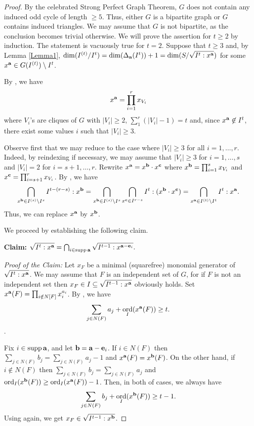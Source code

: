 \documentclass[12pt]{amsart}
\numberwithin{equation}{section}
\theoremstyle{definition}
\theoremstyle{definition}
\DeclareMathOperator{\supp}{supp}
\DeclareMathOperator{\ord}{ord}
\def\a{{\bold a}}
\def\b{{\bold b}}
\def\c{{\bold c}}
\def\e{{\bold e}}
\begin{document}
\begin{proof} By the celebrated Strong Perfect Graph Theorem, $G$ does not contain any induced odd cycle of length $\ge 5$. Thus, either $G$ is a bipartite graph or $G$ contains induced triangles. We may assume that $G$ is not bipartite, as the conclusion becomes trivial otherwise. We will prove the assertion for $t \ge 2$ by induction. The statement is vacuously true for $t=2$. Suppose that $t\ge 3$ and, by Lemma \ref{Lemma1}, $\dim(I^{(t)}/I^{t})=\dim(\Delta_\a(I^{t}))+1=\dim(S/\sqrt{I^t:x^\a})$ for some $x^\a\in G(I^{(t)})\setminus I^{t}$. 
	
By \cite[Theorem 3.10]{Su2008}, we have
	$$x^\a=\prod_{i=1}^r x_{V_i}$$
	where $V_i$'s are cliques of $G$ with $|V_i|\ge 2$, $\sum_1^r(|V_i|-1)=t$ and, since $x^\a \not\in I^t$, there exist some values $i$ such that $|V_i|\ge 3$.
	
Observe first that we may reduce to the case where $|V_i|\ge 3$ for all $i=1,\ldots,r$. Indeed, by reindexing if necessary, we may assume that $|V_i| \ge 3$ for $i = 1, \dots, s$ and $|V_i| = 2$ for $i = s+1, \dots, r$. Rewrite $x^\a=x^\b\cdot x^\c$ where $x^\b=\prod_{i=1}^s x_{V_i}$ and
	$x^\c=\prod_{i=s+1}^r x_{V_i}$. By \cite[Lemma 2.12]{MV2012}, we have
	$$\bigcap_{x^\b \in I^{(s)} \setminus I^s} I^{t-(r-s)}:x^\b=\bigcap_{x^\b \in I^{(s)}\setminus I^s} \bigcap_{x^\c\in I^{r-s}} I^t:(x^\b \cdot x^\c) = \bigcap_{x^\a \in I^{(t)} \setminus I^t} I^t: x^\a.$$
	Thus, we can replace $x^\a$ by $x^\b$.
	
We proceed by establishing the following claim.
	
\noindent \textbf{Claim:} $\sqrt{I^t:x^\a}=\bigcap_{i\in \supp\a}\sqrt{I^{t-1}:x^{\a-\e_i}}.$
	
\noindent\textit{Proof of the Claim:} Let $x_F$ be a minimal (squarefree) monomial generator of $\sqrt{I^t:x^\a}$. We may assume that $F$ is an independent set of $G$, for if $F$ is not an independent set then $x_F \in I \subseteq \sqrt{I^{t-1} : x^\a}$ obviously holds. Set $x^\a(F)=\prod_{i\notin N[F]}x_i^{a_i}$. By  \cite[Lemma 2.18]{MV2023}, we have
	$$\sum_{j\in N(F)}a_j+\ord_{I}(x^\a(F))\ge t.$$. 
	
	Fix $i\in\supp \a$, and let $\b=\a-\e_i$. 
	If $i\in N(F)$ then $\sum_{j\in N(F)}b_j=\sum_{j\in N(F)}a_j-1$ and $x^\a(F)=x^\b(F)$. 
	On the other hand, if $i\notin N(F)$ then $\sum_{j\in N(F)}b_j=\sum_{j\in N(F)}a_j$ and $\ord_I(x^\b(F))\ge \ord_I(x^\a(F))-1$. Then, in both of cases, we always have 
	$$\sum_{j\in N(F)} b_j + \ord_{I} (x^\b(F))\ge t-1.$$ Using \cite[Lemma 2.18]{MV2023} again, we get $x_F\in\sqrt{I^{t-1}:x^\b}$. 
	

\end{proof}
\end{document}
